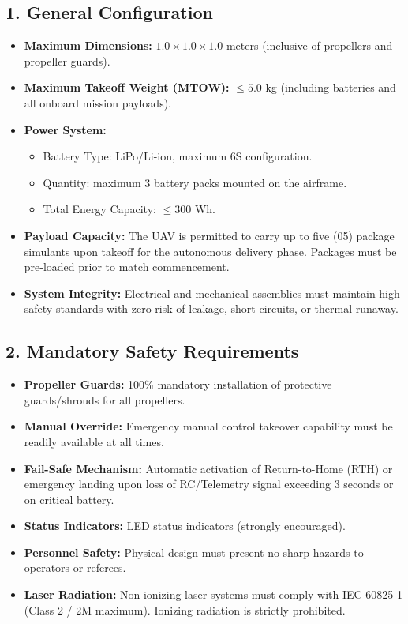 \documentclass[12pt,a4paper]{article}
\begin{document}
\subsection*{1. General Configuration}
\begin{itemize}
\item \textbf{Maximum Dimensions:} $1.0 \times 1.0 \times 1.0$ meters (inclusive of propellers and propeller guards).
\item \textbf{Maximum Takeoff Weight (MTOW):} $\leq 5.0$ kg (including batteries and all onboard mission payloads).
\item \textbf{Power System:}
  \begin{itemize}
    \item Battery Type: LiPo/Li-ion, maximum 6S configuration.
    \item Quantity: maximum 3 battery packs mounted on the airframe.
    \item Total Energy Capacity: $\leq 300$ Wh.
  \end{itemize}
\item \textbf{Payload Capacity:} The UAV is permitted to carry up to five (05) package simulants upon takeoff for the autonomous delivery phase. Packages must be pre-loaded prior to match commencement.
\item \textbf{System Integrity:} Electrical and mechanical assemblies must maintain high safety standards with zero risk of leakage, short circuits, or thermal runaway.
\end{itemize}

\subsection*{2. Mandatory Safety Requirements}
\begin{itemize}
\item \textbf{Propeller Guards:} 100\% mandatory installation of protective guards/shrouds for all propellers.
\item \textbf{Manual Override:} Emergency manual control takeover capability must be readily available at all times.
\item \textbf{Fail-Safe Mechanism:} Automatic activation of Return-to-Home (RTH) or emergency landing upon loss of RC/Telemetry signal exceeding 3 seconds or on critical battery.
\item \textbf{Status Indicators:} LED status indicators (strongly encouraged).
\item \textbf{Personnel Safety:} Physical design must present no sharp hazards to operators or referees.
\item \textbf{Laser Radiation:} Non-ionizing laser systems must comply with IEC 60825-1 (Class 2 / 2M maximum). Ionizing radiation is strictly prohibited.
\end{itemize}
\end{document}
